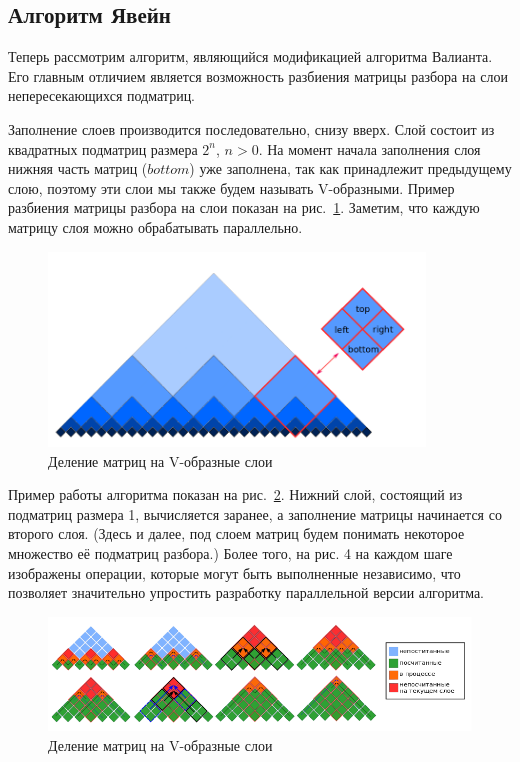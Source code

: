 \documentclass[14pt]{matmex-diploma-custom}
\begin{document}
\subsection{Алгоритм Явейн}

Теперь рассмотрим алгоритм, являющийся модификацией алгоритма Валианта. Его главным отличием является возможность разбиения матрицы разбора на слои непересекающихся подматриц.

Заполнение слоев производится последовательно, снизу вверх. Слой состоит из квадратных подматриц размера $2^n$, $n > 0$. На момент начала заполнения слоя нижняя часть матриц ($bottom$) уже заполнена, так как принадлежит предыдущему слою, поэтому эти слои мы также будем называть V-образными. Пример разбиения матрицы разбора на слои показан на рис.~\ref{fig2}. Заметим, что каждую матрицу слоя можно обрабатывать параллельно. 


\begin{figure}
\vspace{3mm}
 \begin{center}
    \centering
    \includegraphics[width=10cm]{layers.png}
    \caption{Деление матриц на V-образные слои}
    \label{fig2}
 \end{center}
\vspace{-8mm}
\end{figure}

Пример работы алгоритма показан на рис.~\ref{modvis}. Нижний слой, состоящий из подматриц размера 1, вычисляется заранее, а заполнение матрицы начинается со второго слоя. (Здесь и далее, под слоем матриц будем понимать некоторое множество её подматриц разбора.) Более того, на рис. 4 на каждом шаге изображены операции, которые могут быть выполненные независимо, что позволяет значительно упростить разработку параллельной версии алгоритма.

\begin{figure}[h]
\vspace{3mm}
 \begin{center}
    \centering
    \includegraphics[width=16cm]{modivis2.png}
    \caption{Деление матриц на V-образные слои}
    \label{modvis}
 \end{center}
\vspace{-8mm}
\end{figure}
\end{document}
